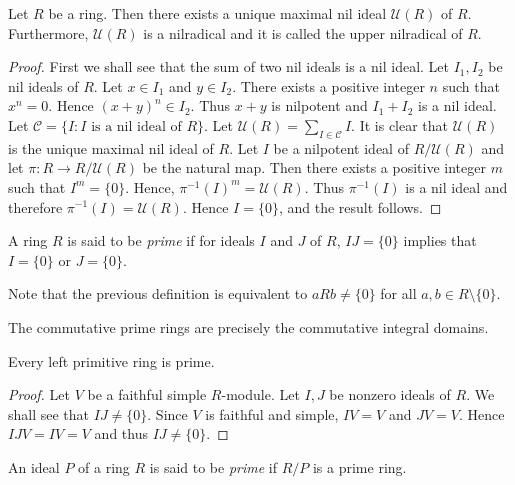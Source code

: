 \begin{proposition}\label{Prop1.3.4}
Let $R$ be a ring. Then there exists a unique maximal nil ideal $\mathcal{U}(R)$ of $R$. 
Furthermore, $\mathcal{U}(R)$ is a nilradical and it is called the upper nilradical of $R$.
\end{proposition}

\begin{proof}
First we shall see that the sum of two nil ideals is a nil ideal. Let $I_1,I_2$ be  nil ideals of $R$. 
Let $x\in I_1$ and $y\in I_2$. There exists a positive integer $n$ such that $x^n=0$. Hence $(x+y)^n\in
I_2$. Thus $x+y$ is nilpotent and $I_1+I_2$ is a nil ideal. Let $\mathcal{C}=\{ I : I\mbox{ is a nil ideal of }R\}$.
Let $\mathcal{U}(R)=\sum_{I\in \mathcal{C}}I$. It is clear that  $\mathcal{U}(R)$ is the unique maximal nil ideal of $R$. 
Let $I$ be a nilpotent ideal of $R/\mathcal{U}(R)$ and let
$\pi\colon R\rightarrow R/\mathcal{U}(R)$ be the natural map. Then
there exists a positive integer $m$ such that $I^m=\{0\}$. Hence, $\pi
^{-1}(I)^m=\mathcal{U}(R)$. Thus $\pi ^{-1}(I)$ is a nil ideal and therefore
$\pi ^{-1}(I)=\mathcal{U}(R)$. Hence $I=\{0\}$, and the result follows.
\end{proof}

\begin{definition}
A ring $R$ is said to be \emph{prime} if for ideals $I$ and $J$ of $R$, $IJ=\{0\}$ implies that
$I=\{0\}$ or $J=\{0\}$. 
\end{definition}

Note that the previous definition is equivalent to $aRb\neq\{0\}$ for all $a,b\in R\setminus\{0\}$.

\begin{example}
The commutative prime rings are precisely the commutative integral domains.
\end{example}

\begin{proposition}\label{Prop1.3.5}
Every left primitive ring is prime.
\end{proposition}

\begin{proof}
Let $V$ be a faithful simple $R$-module. Let $I,J$ be nonzero ideals of
$R$. We shall see that $IJ\neq \{0\}$. Since $V$ is faithful and simple,
$IV=V$ and $JV=V$. Hence $IJV=IV=V$ and thus $IJ\neq \{0\}$. 
\end{proof}

\begin{definition}
An ideal $P$ of a ring $R$ is said to be \emph{prime} if $R/P$ is a prime ring.
\end{definition}

